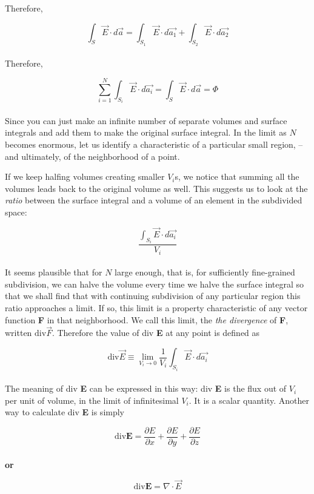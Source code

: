 \documentclass[svgnames]{article}
\begin{document}
Therefore, 

\[ \int_S \vec{E} \cdot d\vec{a} = \int_{S_1} \vec{E} \cdot d\vec{a_1} + \int_{S_2} \vec{E} \cdot d\vec{a_2} \] \\ 

Therefore, 

\[ \sum_{i=1}^N \int_{S_i} \vec{E} \cdot d\vec{a_i} = \int_S \vec{E} \cdot d\vec{a} = \Phi \] \\ 

Since you can just make an infinite number of separate volumes and surface integrals and add them to make the original surface integral. In the limit as $N$ becomes enormous, let us identify a characteristic of a particular small region, -- and ultimately, of the neighborhood of a point.  

If we keep halfing volumes creating smaller $V_i$s, we notice that summing all the volumes leads back to the original volume as well. This suggests us to look at the \textit{ratio} between the surface integral and a volume of an element in the subdivided space: 

\[ \frac{\int_{S_i} \vec{E} \cdot d\vec{a_i}}{V_i} \] \\

It seems plausible that for $N$ large enough, that is, for sufficiently fine-grained subdivision, we can halve the volume every time we halve the surface integral so that we shall find that with continuing subdivision of any particular region this ratio approaches a limit. If so, this limit is a property characteristic of any vector function \textbf{F} in that neighborhood. We call this limit, the \textit{the divergence} of \textbf{F}, written $\text{div} \vec{F}$. Therefore the value of div \textbf{E} at any point is defined as 

\[ \text{div} \vec{E} \equiv \lim_{V_i \to 0} \frac{1}{V_i} \int_{S_i} \vec{E} \cdot d\vec{a_i} \] \\

The meaning of div \textbf{E} can be expressed in this way: div \textbf{E} is the flux out of $V_i$ per unit of volume, in the limit of infinitesimal $V_i$. It is a scalar quantity. Another way to calculate div \textbf{E} is simply 

\[ \text{div} \textbf{E} = \frac{\partial E}{\partial x} + \frac{\partial E}{\partial y} + \frac{\partial E}{\partial z} \]\\

\textbf{or} 

\[ \text{div} \textbf{E} = \nabla \cdot \vec{E} \] \\
\end{document}
